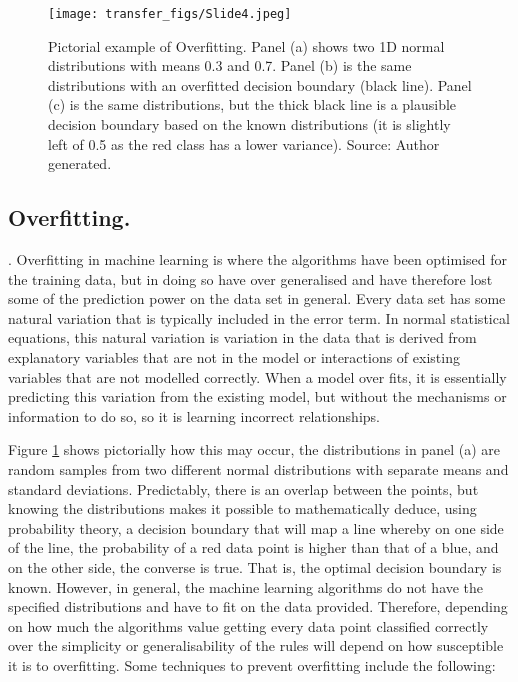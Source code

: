 \begin{figure}
  \texttt{[image: transfer\_figs/Slide4.jpeg]}
  \caption[Pictorial example of Overfitting.]{Pictorial example of Overfitting. Panel (a) shows two 1D normal distributions with means 0.3 and 0.7. Panel (b) is the same distributions with an overfitted decision boundary (black line). Panel (c) is the same distributions, but the thick black line is a plausible decision boundary based on the known distributions (it is slightly left of 0.5 as the red class has a lower variance). Source: Author generated.}
  \label{fig:overfit}
\end{figure}



\subsection{Overfitting.} \parencite{chollet_allaire_2018}. Overfitting in machine learning is where the algorithms have been optimised for the training data, but in doing so have over generalised and have therefore lost some of the prediction power on the data set in general. Every data set has some natural variation that is typically included in the error term. In normal statistical equations, this natural variation is variation in the data that is derived from explanatory variables that are not in the model or interactions of existing variables that are not modelled correctly. When a model over fits, it is essentially predicting this variation from the existing model, but without the mechanisms or information to do so, so it is learning incorrect relationships.  

Figure \ref{fig:overfit} shows pictorially how this may occur, the distributions in panel (a) are random samples from two different normal distributions with separate means and standard deviations. Predictably, there is an overlap between the points, but knowing the distributions makes it possible to mathematically deduce, using probability theory, a decision boundary that will map a line whereby on one side of the line, the probability of a red data point is higher than that of a blue, and on the other side, the converse is true. That is, the optimal decision boundary is known. However, in general, the machine learning algorithms do not have the specified distributions and have to fit on the data provided. Therefore, depending on how much the algorithms value getting every data point classified correctly over the simplicity or generalisability of the rules will depend on how susceptible it is to overfitting. Some techniques to prevent overfitting include the following:


